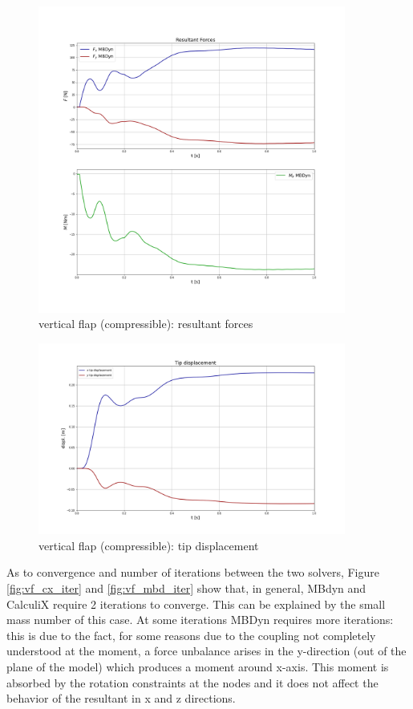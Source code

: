 \begin{figure}[htbp!]
	\centering
	\includegraphics[width=0.9\textwidth, trim=0 100 0 100, clip]{images/comp_flap/forces_comp.png}
	\caption{vertical flap (compressible): resultant forces}
	\label{fig:comp_force}
\end{figure}



\begin{figure}[htbp!]
	\centering
	\includegraphics[width=0.9\textwidth, trim=0 50 0 50, clip]{images/comp_flap/disp_comp.png}
	\caption{vertical flap (compressible): tip displacement}
	\label{fig:comp_displacement}
\end{figure}


As to convergence and number of iterations between the two solvers, Figure \ref{fig:vf_cx_iter} and \ref{fig:vf_mbd_iter} show that, in general, MBdyn and CalculiX require 2 iterations to converge. This can be explained by the small mass number of this case. At some iterations MBDyn requires more iterations: this is due to the fact, for some reasons due to the coupling not completely understood at the moment, a force unbalance arises in the y-direction (out of the plane of the model) which produces a moment around x-axis. This moment is absorbed by the rotation constraints at the nodes and it does not affect the behavior of the resultant in x and z directions. 



